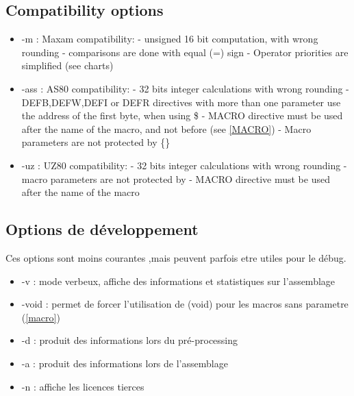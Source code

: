 \begin{xen}
\subsection{Compatibility options}
\begin{itemize}

\item -m : Maxam compatibility:
\subitem - unsigned 16 bit computation, with wrong rounding
\subitem - comparisons are done with equal (=) sign
\subitem - Operator priorities are simplified (see charts)

\item -ass : AS80 compatibility:
\subitem - 32 bits integer calculations with wrong rounding
\subitem - DEFB,DEFW,DEFI or DEFR directives with more than one parameter use the address of the first byte, when using \$ %
\subitem - MACRO directive must be used after the name of the macro, and not before (see \ref{MACRO})
\subitem - Macro parameters are not protected by \{\}

\item -uz : UZ80 compatibility:
\subitem - 32 bits integer calculations with wrong rounding
\subitem - macro parameters are not protected by {}
\subitem - MACRO directive must be used after the name of the macro
\end{itemize}

\end{xen}


\begin{xfr}
\subsection{Options de développement}
Ces options sont moins courantes ,mais peuvent parfois etre utiles pour le débug.
\begin{itemize}
\item -v : mode verbeux, affiche des informations et statistiques sur l'assemblage
\item -void : permet de forcer l'utilisation de (void) pour les macros sans parametre (\ref{macro})
\item -d : produit des informations lors du pré-processing
\item -a : produit des informations lors de l'assemblage
\item -n : affiche les licences tierces
\end{itemize}

\end{xfr}

